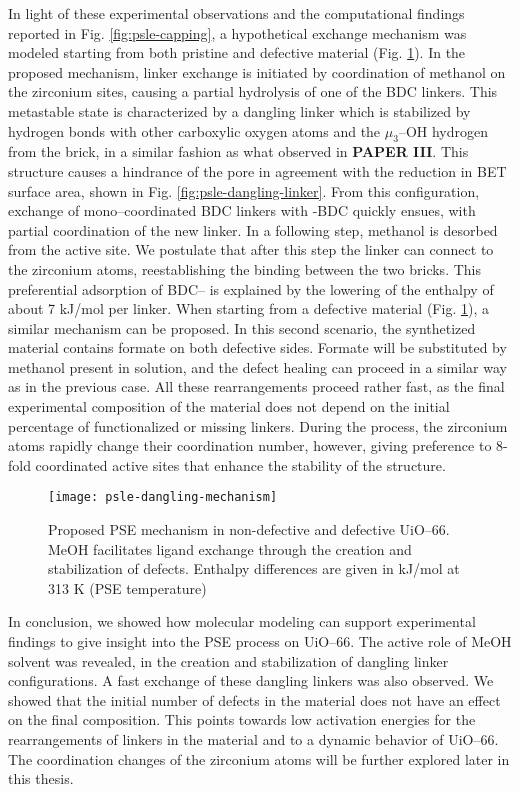 In light of these experimental observations and the computational findings reported in Fig. \ref{fig:psle-capping}, a hypothetical exchange mechanism was modeled starting from both pristine and defective material (Fig. \ref{fig:psle-dangling-mechanism}). In the proposed mechanism, linker exchange is initiated by coordination of methanol on the zirconium sites, causing a partial hydrolysis of one of the BDC linkers. This metastable state is characterized by a dangling linker which is stabilized by hydrogen bonds with other carboxylic oxygen atoms and the $\mu_3$--OH hydrogen from the brick, in a similar fashion as what observed in \textbf{PAPER III}. This structure causes a hindrance of the pore in agreement with the reduction in BET surface area, shown in Fig. \ref{fig:psle-dangling-linker}. From this configuration, exchange of mono--coordinated BDC linkers with -BDC quickly ensues, with partial coordination of the new linker. In a following step, methanol is desorbed from the active site. We postulate that after this step the linker can connect to the zirconium atoms, reestablishing the binding between the two bricks. This preferential adsorption of BDC-- is explained by the lowering of the enthalpy of about 7 kJ/mol per linker. When starting from a defective material (Fig. \ref{fig:psle-dangling-mechanism}), a similar mechanism can be proposed. In this second scenario, the synthetized material contains formate on both defective sides. Formate will be substituted by methanol present in solution, and the defect healing can proceed in a similar way as in the previous case. All these rearrangements proceed rather fast, as the final experimental composition of the material does not depend on the initial percentage of functionalized or missing linkers. During the process, the zirconium atoms rapidly change their coordination number, however, giving preference to 8-fold coordinated active sites that enhance the stability of the structure. 
\begin{figure}[!htbp]
	\centering
	\texttt{[image: psle-dangling-mechanism]}
	\caption{Proposed PSE mechanism in non-defective and defective UiO--66. MeOH facilitates ligand exchange through the creation and stabilization of defects. Enthalpy differences are given in kJ/mol at 313 K (PSE temperature)}
	\label{fig:psle-dangling-mechanism}
\end{figure}
\npar
In conclusion, we showed how molecular modeling can support experimental findings to give insight into the PSE process on UiO--66. The active role of MeOH solvent was revealed, in the creation and stabilization of dangling linker configurations. A fast exchange of these dangling linkers was also observed. We showed that the initial number of defects in the material does not have an effect on the final composition. This points towards low activation energies for the rearrangements of linkers in the material and to a dynamic behavior of UiO--66. The coordination changes of the zirconium atoms will be further explored later in this thesis.

